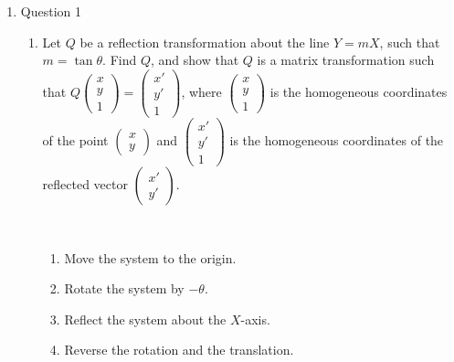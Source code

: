 \documentclass{zc-ust-hw}
\begin{document}
\maketitle

\begin{enumerate}
  \item Question 1
    \begin{enumerate}
      \item Let $Q$ be a reflection transformation about the line $Y=mX$, such that $m=\tan\theta$. Find $Q$, and show that $Q$ is a matrix transformation such that $Q\begin{pmatrix} x\\y\\1 \end{pmatrix}=\begin{pmatrix} x'\\y'\\1 \end{pmatrix} $, where $\begin{pmatrix} x\\y\\1 \end{pmatrix} $ is the homogeneous coordinates of the point $\begin{pmatrix} x\\y \end{pmatrix} $ and $\begin{pmatrix} x'\\y'\\1 \end{pmatrix} $ is the homogeneous coordinates of the reflected vector $\begin{pmatrix} x'\\y' \end{pmatrix} $.
        \begin{figure}[ht]
          \centering\fontsize{0.75em}{1em}
          \caption{}
          \label{fig:q-transformation-plot}
        \end{figure}
        \begin{sol}\,
          \begin{enumerate}[label=\arabic*)]
            \item Move the system to the origin.
            \item Rotate the system by $-\theta$.
            \item Reflect the system about the $X$-axis.
            \item Reverse the rotation and the translation.

\end{enumerate}
\end{sol}
\end{enumerate}
\end{enumerate}
\end{document}

